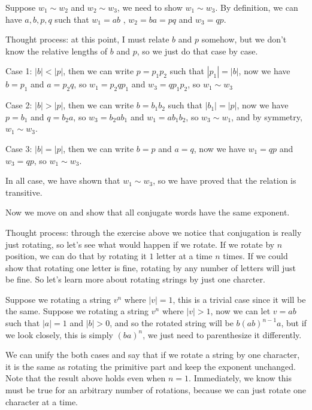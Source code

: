 \documentclass{article}
\begin{document}
Suppose $ w_1 \sim w_2 $ and $ w_2 \sim w_3 $, we need to show $ w_1 \sim w_3 $. By definition, we can have $ a, b, p, q $ such that $ w_1 = ab $ , $ w_2 = ba = pq $ and $ w_3 = qp $.

Thought process: at this point, I must relate $ b $ and $ p $ somehow, but we don't know the relative lengths of $ b $ and $ p $, so we just do that case by case.

Case 1: $ |b| < |p| $, then we can write $ p = p_1 p_2 $ such that $ |p_1| = |b| $, now we have $ b = p_1 $ and $ a = p_2 q $, so $ w_1 = p_2 q p_1  $ and $ w_3 = q p_1 p_2 $, so $ w_1 \sim w_3 $

Case 2: $ |b| > |p| $, then we can write $ b = b_1 b_2 $ such that $ |b_1| = |p| $, now we have $ p = b_1 $ and $ q = b_2 a $, so $ w_3 = b_2 a b_1 $ and $ w_1 = a b_1 b_2 $, so $ w_3 \sim w_1 $, and by symmetry, $ w_1 \sim w_3 $.

Case 3: $ |b| = |p| $, then we can write $ b = p $ and $ a = q $, now we have $ w_1 = q p $ and $ w_3 = q p $, so $ w_1 \sim w_3 $.

In all case, we have shown that $ w_1 \sim w_3 $, so we have proved that the relation is transitive.

Now we move on and show that all conjugate words have the same exponent.

Thought process: through the exercise above we notice that conjugation is really just rotating, so let's see what would happen if we rotate. If we rotate by $ n $ position, we can do that by rotating it $ 1 $ letter at a time $ n $ times. If we could show that rotating one letter is fine, rotating by any number of letters will just be fine. So let's learn more about rotating strings by just one charcter.

Suppose we rotating a string $ v^n $ where $ |v| = 1 $, this is a trivial case since it will be the same.
Suppose we rotating a string $ v^n $ where $ |v| > 1 $, now we can let $ v = ab $ such that $ |a| = 1 $ and $ |b| > 0 $, and so the rotated string will be $ b(ab)^{n-1}a $, but if we look closely, this is simply $ (ba)^n $, we just need to parenthesize it differently. 

We can unify the both cases and say that if we rotate a string by one character, it is the same as rotating the primitive part and keep the exponent unchanged. Note that the result above holds even when $ n = 1 $. Immediately, we know this must be true for an arbitrary number of rotations, because we can just rotate one character at a time.
\end{document}
